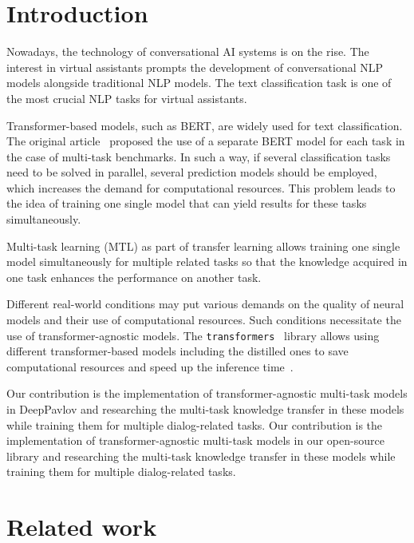 \section{Introduction}
Nowadays, the technology of conversational AI systems is on the rise. The interest in virtual assistants prompts the development of conversational NLP models alongside traditional NLP models. The text classification task is one of the most crucial NLP tasks for virtual assistants.

Transformer-based models, such as BERT, are widely used for text classification. The original article~\cite{bert} proposed the use of a separate BERT model for each task in the case of multi-task benchmarks. In such a way, if several classification tasks need to be solved in parallel, several prediction models should be employed, which increases the demand for computational resources. This problem leads to the idea of training one single model that can yield results for these tasks simultaneously. 

Multi-task learning (MTL) as part of transfer learning allows training one single model simultaneously for multiple related tasks so that the knowledge acquired in one task enhances the performance on another task.

Different real-world conditions may put various demands on the quality of neural models and their use of computational resources. Such conditions necessitate the use of transformer-agnostic models. The \texttt{transformers}~\cite{huggingface_transformers} library allows using different transformer-based models including the distilled ones to save computational resources and speed up the inference time~\cite{alina}. 

\ifinterspeechfinal
Our contribution is the implementation of transformer-agnostic multi-task models in DeepPavlov and researching the multi-task knowledge transfer in these models while training them for multiple dialog-related tasks.
\else
Our contribution is the implementation of transformer-agnostic multi-task models in our open-source library and researching the multi-task knowledge transfer in these models while training them for multiple dialog-related tasks.
\fi
\section{Related work}

